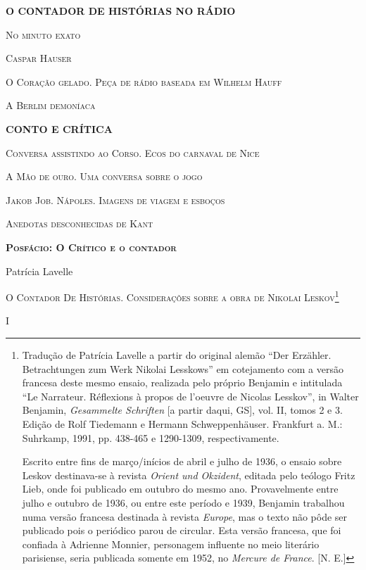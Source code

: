 \textbf{O CONTADOR DE HISTÓRIAS NO RÁDIO}

\textsc{No minuto exato}

\textsc{Caspar Hauser}

\textsc{O Coração gelado. Peça de rádio baseada em Wilhelm Hauff}

\textsc{A Berlim demoníaca}

\textbf{CONTO E CRÍTICA}

\textsc{Conversa assistindo ao Corso. Ecos do carnaval de Nice}

\textsc{A Mão de ouro. Uma conversa sobre o jogo}

\textsc{Jakob Job. Nápoles. Imagens de viagem e esboços}

\textsc{Anedotas desconhecidas de Kant}

\textbf{\textsc{Posfácio: O Crítico e o contador}}

Patrícia Lavelle

\textsc{O Contador De Histórias. Considerações sobre a obra de Nikolai
Leskov}\footnote{Tradução de Patrícia Lavelle a partir do original
  alemão ``Der Erzähler. Betrachtungen zum Werk Nikolai Lesskows'' em
  cotejamento com a versão francesa deste mesmo ensaio, realizada pelo
  próprio Benjamin e intitulada ``Le Narrateur. Réflexions à propos de
  l'oeuvre de Nicolas Lesskov'', in Walter Benjamin, \emph{Gesammelte
  Schriften} {[}a partir daqui, GS{]}, vol. II, tomos 2 e 3. Edição de
  Rolf Tiedemann e Hermann Schweppenhäuser. Frankfurt a. M.: Suhrkamp,
  1991, pp. 438-465 e 1290-1309, respectivamente.

  Escrito entre fins de março/inícios de abril e julho de 1936, o ensaio
  sobre Leskov destinava-se à revista \emph{Orient und Okzident},
  editada pelo teólogo Fritz Lieb, onde foi publicado em outubro do
  mesmo ano. Provavelmente entre julho e outubro de 1936, ou entre este
  período e 1939, Benjamin trabalhou numa versão francesa destinada à
  revista \emph{Europe}, mas o texto não pôde ser publicado pois o
  periódico parou de circular. Esta versão francesa, que foi confiada à
  Adrienne Monnier, personagem influente no meio literário parisiense,
  seria publicada somente em 1952, no \emph{Mercure de France}. {[}N.
  E.{]}}

I

